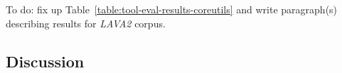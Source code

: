 To do: fix up Table~\ref{table:tool-eval-results-coreutils} and write paragraph(s) describing results for \emph{LAVA2} corpus.



\subsection*{Discussion}

